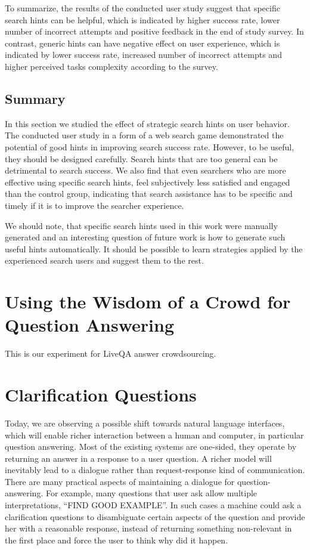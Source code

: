 To summarize, the results of the conducted user study suggest that specific search hints can be helpful, which is indicated by higher success rate, lower number of incorrect attempts and positive feedback in the end of study survey.
In contrast, generic hints can have negative effect on user experience, which is indicated by lower success rate, increased number of incorrect attempts and higher perceived tasks complexity according to the survey.

\subsection{Summary}
In this section we studied the effect of strategic search hints on user behavior. 
The conducted user study in a form of a web search game demonstrated the potential of good hints in improving search success rate.
However, to be useful, they should be designed carefully.
Search hints that are too general can be detrimental to search success.
We also find that even searchers who are more effective using specific search hints, feel subjectively less satisfied and engaged than the control group, indicating that search assistance has to be specific and timely if it is to improve the searcher experience.

We should note, that specific search hints used in this work were manually generated and an interesting question of future work is how to generate such useful hints automatically.
It should be possible to learn strategies applied by the experienced search users and suggest them to the rest.

\section{Using the Wisdom of a Crowd for Question Answering}
\label{sec:user:crowd}

This is our experiment for LiveQA answer crowdsourcing.

\section{Clarification Questions}
\label{sec:user:clarification}

Today, we are observing a possible shift towards natural language interfaces, which will enable richer interaction between a human and computer, in particular question answering.
Most of the existing systems are one-sided, \ie they operate by returning an answer in a response to a user question.
A richer model will inevitably lead to a dialogue rather than request-response kind of communication.
There are many practical aspects of maintaining a dialogue for question-answering.
For example, many questions that user ask allow multiple interpretations, \eg ``FIND GOOD EXAMPLE''.
In such cases a machine could ask a clarification questions to disambiguate certain aspects of the question and provide her with a reasonable response, instead of returning something non-relevant in the first place and force the user to think why did it happen.

